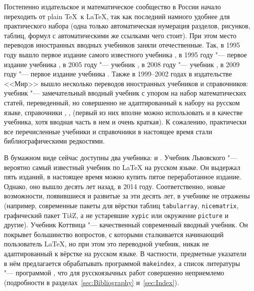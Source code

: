 \documentclass[a4paper,12pt,hyphens]{article}
\newcommand\package[1]{\texttt{#1}}
\newcommand\exe[1]{\texttt{#1}}
\DeclareRobustCommand{\TikZ}{\textrm{Ti\textit{k}Z}}
\begin{document}
Постепенно издательское и математическое сообщество в России начало переходить от plain \TeX\ к \LaTeX, так как последний
намного удобнее для практического набора (одна только автоматическая нумерация разделов, рисунков, таблиц, формул с автоматическими
же ссылками чего стоит). При этом место переводов иностранных вводных учебников заняли отечественные. Так, в 1995 году вышло первое издание самого известного учебника \parencite{lvovskiy:2014}, в 1995 году "--- первое издание учебника \parencite{kotelnikov-chebotaev:2016}, в 2005 году "--- учебник \parencite{rozhenko:2005}, в 2008 году "--- учебник \parencite{baldin:2008}, в 2009 году "--- первое издание учебника \parencite{belyakov-palosh-sadovskiy:2012}. Также в 1999--2002 годах в издательстве <<Мир>> вышло несколько переводов иностранных учебников и справочников: учебник \parencite{gratzer:2000} "--- замечательный вводный учебник с упором на набор математических статей, переведенный, но совершенно не адаптированный к набору на русском языке, справочники \parencite{gussens-mittelbach-samarin:1999}, \parencite{gussens-ratz:2001}, \parencite{gussens-ratz-mittelbach:2002} (первый из них вполне можно использовать и в качестве учебника, хотя вводная часть в нем и очень краткая). К сожалению, практически все перечисленные учебники и справочники в настоящее время стали библиографическими редкостями.

В бумажном виде сейчас доступны два учебника: \parencite{lvovskiy:2014} и \parencite{kottwitz:2022}. Учебник Львовского \parencite{lvovskiy:2014} "--- вероятно самый известный учебник по \LaTeX{} на русском языке. Он выдержал пять изданий, в настоящее время можно купить пятое переработанное издание. Однако, оно вышло десять лет назад, в 2014 году. Соответственно, новые возможности, появившиеся и развитые за эти десять лет, в учебнике не отражены (например, современные пакеты для вёрстки таблиц \package{tabularray}, \package{nicematrix}, графический пакет \TikZ{}, а не устаревшие \package{xypic} \parencite{ctan-xypic} или окружение \package{picture} и другие). Учебник Коттвица \parencite{kottwitz:2022} "--- качественный современный вводный учебник. Он покрывет большинство вопростов, с которыми сталкивается начинающий пользователь \LaTeX, но при этом это переводной учебник, никак не адаптированный к вёрстке на русском языке. В частности, предметные указатели в нём предлагается обрабатывать программой \exe{makeindex}, а список литературы "--- программой \BibTeX, что для русскоязычных работ совершенно неприемлемо (подробности в разделах~\ref{sec:Bibliography} и~\ref{sec:Index}).
\end{document}
